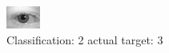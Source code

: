 \begin{figure}[h!]
\begin{center}
\includegraphics[width=0.60\columnwidth]{figures/ID565_class_2_target_3.png}
\end{center}
\caption{ Classification: 2 actual target: 3}
\label{fig:ID565_class_2_target_3}
\end{figure}
